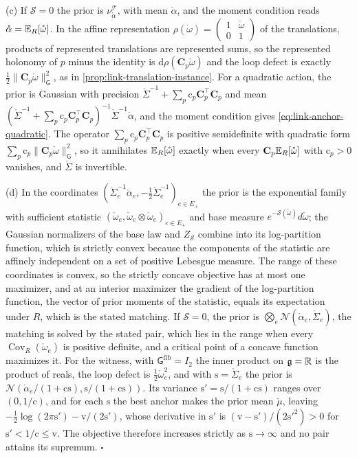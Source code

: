 (c) If $\mathscr S=0$ the prior is $\nu^{\mathscr T}_{\mathring\alpha}$, with mean $\mathring\alpha$,
and the moment condition reads $\mathring\alpha=\mathbb E_R[\mathring\omega]$. In the affine representation
$\rho(\mathring\omega)=\left(\begin{smallmatrix}1&\mathring\omega\\0&1\end{smallmatrix}\right)$ of the
translations, products of represented translations are represented sums, so the represented
holonomy of $p$ minus the identity is $\mathrm d\rho(\mathbf C_p\mathring\omega)$ and the loop defect
is exactly $\tfrac12\lVert\mathbf C_p\mathring\omega\rVert_{\mathsf G}^2$, as in
\cref{prop:link-translation-instance}. For a quadratic action, the
prior is Gaussian with precision $\mathring\Sigma^{-1}+\sum_p\mathrm c_p\mathbf C_p^\top\mathbf C_p$ and
mean $(\mathring\Sigma^{-1}+\sum_p\mathrm c_p\mathbf C_p^\top\mathbf C_p)^{-1}\mathring\Sigma^{-1}\mathring\alpha$,
and the moment condition gives \eqref{eq:link-anchor-quadratic}. The operator
$\sum_p\mathrm c_p\mathbf C_p^\top\mathbf C_p$ is positive semidefinite with quadratic form
$\sum_p\mathrm c_p\lVert\mathbf C_p\mathring\omega\rVert_{\mathsf G}^2$, so it annihilates
$\mathbb E_R[\mathring\omega]$ exactly when every $\mathbf C_p\mathbb E_R[\mathring\omega]$ with $\mathrm c_p>0$
vanishes, and $\mathring\Sigma$ is invertible.

(d) In the coordinates $(\mathring\Sigma_e^{-1}\mathring\alpha_e,-\tfrac12\mathring\Sigma_e^{-1})_{e\in E_+}$
the prior is the exponential family with sufficient statistic
$(\mathring\omega_e,\mathring\omega_e\otimes\mathring\omega_e)_{e\in E_+}$ and base measure
$e^{-\mathscr S(\mathring\omega)}d\mathring\omega$; the Gaussian normalizers of the base law and
$Z_{\mathscr S}$ combine into its log-partition function, which is strictly convex because the
components of the statistic are affinely independent on a set of positive Lebesgue measure. The
range of these coordinates is convex, so the strictly concave objective has at most one maximizer,
and at an interior maximizer the gradient of the log-partition function, the vector of prior moments
of the statistic, equals its expectation under $R$, which is the stated matching. If $\mathscr S=0$,
the prior is $\bigotimes_e\mathcal N(\mathring\alpha_e,\mathring\Sigma_e)$, the matching is solved by
the stated pair, which lies in the range when every $\operatorname{Cov}_R(\mathring\omega_e)$ is
positive definite, and a critical point of a concave function maximizes it. For the witness, with
$\mathsf G^{\mathrm{fib}}=I_2$ the inner product on $\mathfrak g=\mathbb R$ is the product of reals, the loop
defect is $\tfrac12\mathring\omega_e^2$, and with $\mathrm s=\mathring\Sigma_e$ the prior is
$\mathcal N(\mathring\alpha_e/(1+\mathrm c\mathrm s),\mathrm s/(1+\mathrm c\mathrm s))$. Its variance
$\mathrm s'=\mathrm s/(1+\mathrm c\mathrm s)$ ranges over $(0,1/\mathrm c)$, and for each $\mathrm s$
the best anchor makes the prior mean $\mathring\mu$, leaving
$-\tfrac12\log(2\pi\mathrm s')-\mathrm v/(2\mathrm s')$, whose derivative in $\mathrm s'$ is
$(\mathrm v-\mathrm s')/(2\mathrm s'^2)>0$ for $\mathrm s'<1/\mathrm c\leq\mathrm v$. The objective
therefore increases strictly as $\mathrm s\to\infty$ and no pair attains its supremum.
\hfill$\square$

